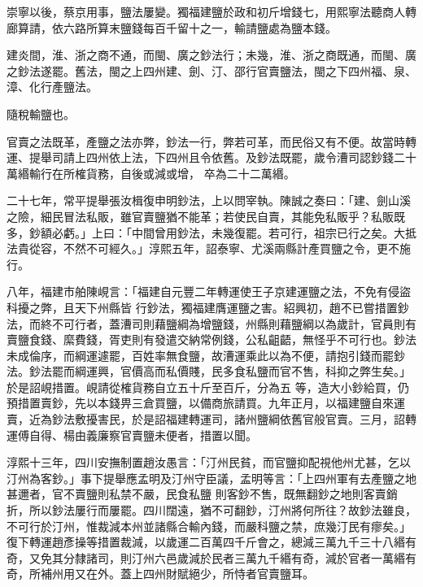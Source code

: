 \begin{pinyinscope}
 崇寧以後，蔡京用事，鹽法屢變。獨福建鹽於政和初斤增錢七，用熙寧法聽商人轉
 廊算請，依六路所算末鹽錢每百千留十之一，輸請鹽處為鹽本錢。



 建炎間，淮、浙之商不通，而閩、廣之鈔法行；未幾，淮、浙之商既通，而閩、廣之鈔法遂罷。舊法，閩之上四州建、劍、汀、邵行官賣鹽法，閩之下四州福、泉、漳、化行產鹽法。



 隨稅輸鹽也。



 官賣之法既革，產鹽之法亦弊，鈔法一行，弊若可革，而民俗又有不便。故當時轉運、提舉司請上四州依上法，下四州且令依舊。及鈔法既罷，歲令漕司認鈔錢二十萬緡輸行在所榷貨務，自後或減或增，
 卒為二十二萬緡。



 二十七年，常平提舉張汝楫復申明鈔法，上以問宰執。陳誠之奏曰：「建、劍山溪之險，細民冒法私販，雖官賣鹽猶不能革；若使民自賣，其能免私販乎？私販既多，鈔額必虧。」上曰：「中間曾用鈔法，未幾復罷。若可行，祖宗已行之矣。大抵法貴從容，不然不可經久。」淳熙五年，詔泰寧、尤溪兩縣計產買鹽之令，更不施行。



 八年，福建市舶陳峴言：「福建自元豐二年轉運使王子京建運鹽之法，不免有侵盜科擾之弊，且天下州縣皆
 行鈔法，獨福建膺運鹽之害。紹興初，趙不已嘗措置鈔法，而終不可行者，蓋漕司則藉鹽綱為增鹽錢，州縣則藉鹽綱以為歲計，官員則有賣鹽食錢、縻費錢，胥吏則有發遣交納常例錢，公私齟齬，無怪乎不可行也。鈔法未成倫序，而綱運遽罷，百姓率無食鹽，故漕運乘此以為不便，請抱引錢而罷鈔法。鈔法罷而綱運興，官價高而私價賤，民多食私鹽而官不售，科抑之弊生矣。」於是詔峴措置。峴請從榷貨務自立五十斤至百斤，分為五
 等，造大小鈔給買，仍預措置賣鈔，先以本錢畀三倉買鹽，以備商旅請買。九年正月，以福建鹽自來運賣，近為鈔法敷擾害民，於是詔福建轉運司，諸州鹽綱依舊官般官賣。三月，詔轉運傅自得、楊由義廉察官賣鹽未便者，措置以聞。



 淳熙十三年，四川安撫制置趙汝愚言：「汀州民貧，而官鹽抑配視他州尤甚，乞以汀州為客鈔。」事下提舉應孟明及汀州守臣議，孟明等言：「上四州軍有去產鹽之地甚邇者，官不賣鹽則私禁不嚴，民食私鹽
 則客鈔不售，既無翻鈔之地則客賣銷折，所以鈔法屢行而屢罷。四川闊遠，猶不可翻鈔，汀州將何所往？故鈔法雖良，不可行於汀州，惟裁減本州並諸縣合輸內錢，而嚴科鹽之禁，庶幾汀民有瘳矣。」復下轉運趙彥操等措置裁減，以歲運二百萬四千斤會之，總減三萬九千三十八緡有奇，又免其分隸諸司，則汀州六邑歲減於民者三萬九千緡有奇，減於官者一萬緡有奇，所補州用又在外。蓋上四州財賦絕少，所恃者官賣鹽耳。




\end{pinyinscope}
